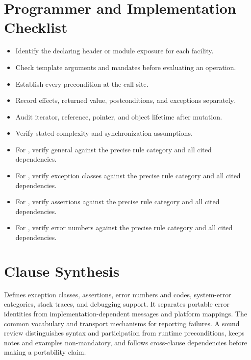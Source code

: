 \documentclass[11pt,letterpaper]{article}
\begin{document}
\section{Programmer and Implementation Checklist}
\begin{CornellReferenceChecklistBox}\begin{itemize}[label=$\square$]
\item Identify the declaring header or module exposure for each facility.
\item Check template arguments and mandates before evaluating an operation.
\item Establish every precondition at the call site.
\item Record effects, returned value, postconditions, and exceptions separately.
\item Audit iterator, reference, pointer, and object lifetime after mutation.
\item Verify stated complexity and synchronization assumptions.
\item For , verify general against the precise rule category and all cited dependencies.
\item For , verify exception classes against the precise rule category and all cited dependencies.
\item For , verify assertions against the precise rule category and all cited dependencies.
\item For , verify error numbers against the precise rule category and all cited dependencies.
\end{itemize}\end{CornellReferenceChecklistBox}
\section{Clause Synthesis}
\begin{CornellReferenceOrientationBox}Defines exception classes, assertions, error numbers and codes, system-error categories, stack traces, and debugging support. It separates portable error identities from implementation-dependent messages and platform mappings. The common vocabulary and transport mechanisms for reporting failures. A sound review distinguishes syntax and participation from runtime preconditions, keeps notes and examples non-mandatory, and follows cross-clause dependencies before making a portability claim.\end{CornellReferenceOrientationBox}
\end{document}
